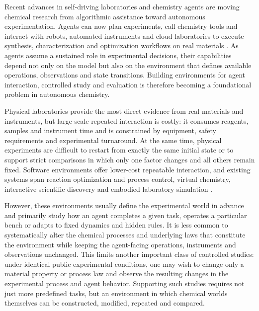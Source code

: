 \documentclass[10pt,twocolumn]{article}
\begin{document}
Recent advances in self-driving laboratories and chemistry agents are
moving chemical research from algorithmic assistance toward autonomous
experimentation. Agents can now plan experiments, call chemistry tools
and interact with robots, automated instruments and cloud laboratories
to execute synthesis, characterization and optimization workflows on
real materials
\citep{boiko2023autonomous, bran2024augmenting, szymanski2023alab, dai2024mobile, darvish2025organa, song2025chemagents, panapitiya2026autolabs, pilon2026robochemflex, vriza2026instruments}.
As agents assume a sustained role in experimental decisions, their
capabilities depend not only on the model but also on the environment
that defines available operations, observations and state transitions.
Building environments for agent interaction, controlled study and
evaluation is therefore becoming a foundational problem in autonomous
chemistry.

Physical laboratories provide the most direct evidence from real
materials and instruments, but large-scale repeated interaction is
costly: it consumes reagents, samples and instrument time and is
constrained by equipment, safety requirements and experimental
turnaround. At the same time, physical experiments are difficult to
restart from exactly the same initial state or to support strict
comparisons in which only one factor changes and all others remain
fixed. Software environments offer lower-cost repeatable interaction,
and existing systems span reaction optimization and process control,
virtual chemistry, interactive scientific discovery and embodied
laboratory simulation
\citep{felton2021summit, hase2021olympus, bloor2024pcgym, beeler2024chemgymrl, jansen2024discoveryworld, gandhi2025boxinggym, duan2025scigym, nagele2026sciexplorer, zheng2026newtonbench, malik2026made, li2025labutopia, wu2026labimus, xu2026scidisco}.

However, these environments usually define the experimental world in
advance and primarily study how an agent completes a given task,
operates a particular bench or adapts to fixed dynamics and hidden
rules. It is less common to systematically alter the chemical processes
and underlying laws that constitute the environment while keeping the
agent-facing operations, instruments and observations unchanged. This
limits another important class of controlled studies: under identical
public experimental conditions, one may wish to change only a material
property or process law and observe the resulting changes in the
experimental process and agent behavior. Supporting such studies
requires not just more predefined tasks, but an environment in which
chemical worlds themselves can be constructed, modified, repeated and
compared.
\end{document}
